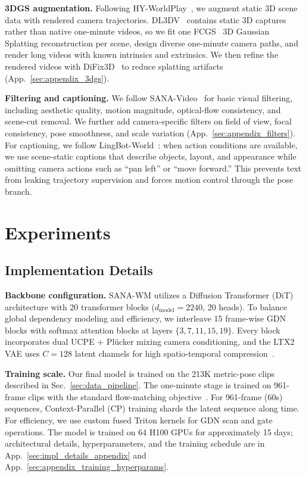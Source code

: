 \documentclass{llmxive}
\providecommand{\modelname}{SANA-WM\xspace}
\begin{document}
\noindent\textbf{3DGS augmentation.}
Following HY-WorldPlay~\citep{hy_worldplay}, we augment static 3D scene data with rendered camera trajectories.
DL3DV~\citep{dl3dv} contains static 3D captures rather than native one-minute videos, so we fit one FCGS~\citep{fcgs} 3D Gaussian Splatting reconstruction per scene, design diverse one-minute camera paths, and render long videos with known intrinsics and extrinsics.
We then refine the rendered videos with DiFix3D~\citep{difix3d} to reduce splatting artifacts (App.~\ref{sec:appendix_3dgs}).


\noindent\textbf{Filtering and captioning.}
We follow SANA-Video~\citep{chen2025sana} for basic visual filtering, including aesthetic quality, motion magnitude, optical-flow consistency, and scene-cut removal.
We further add camera-specific filters on field of view, focal consistency, pose smoothness, and scale variation (App.~\ref{sec:appendix_filters}).
For captioning, we follow LingBot-World~\citep{lingbot_world}: when action conditions are available, we use scene-static captions that describe objects, layout, and appearance while omitting camera actions such as ``pan left'' or ``move forward.''
This prevents text from leaking trajectory supervision and forces motion control through the pose branch.


\section{Experiments}
\label{sec:experiments}


\subsection{Implementation Details}
\label{sec:impl_details}

\noindent\textbf{Backbone configuration.}
\modelname utilizes a Diffusion Transformer (DiT) architecture with 20 transformer blocks ($d_\text{model}{=}2240$, 20 heads). To balance global dependency modeling and efficiency, we interleave 15 frame-wise GDN blocks with softmax attention blocks at layers $\{3,7,11,15,19\}$. Every block incorporates dual UCPE + Pl\"ucker mixing camera conditioning, and the LTX2 VAE uses $C{=}128$ latent channels for high spatio-temporal compression~\citep{dit,gated_deltanet,ucpe,plucker_lfn,ltx2}.

\noindent\textbf{Training scale.}
Our final model is trained on the 213K metric-pose clips described in Sec.~\ref{sec:data_pipeline}. 
The one-minute stage is trained on 961-frame clips with the standard flow-matching objective~\citep{flow_matching}. 
For 961-frame (60s) sequences, Context-Parallel (CP) training shards the latent sequence along time. 
For efficiency, we use custom fused Triton kernels for GDN scan and gate operations. 
The model is trained on 64 H100 GPUs for approximately 15 days; architectural details, hyperparameters, and the training schedule are in App.~\ref{sec:impl_details_appendix} and App.~\ref{sec:appendix_training_hyperparams}.
\end{document}
